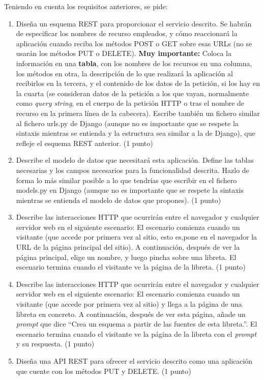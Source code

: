 \newpage

Teniendo en cuenta los requisitos anteriores, se pide:

\begin{enumerate}
  \item Diseña un esquema REST para proporcionar el servicio descrito. Se habrán de especificar los nombres de recurso empleados, y cómo reaccionará la aplicación cuando reciba los métodos POST o GET sobre esas URLs (no se usarán los métodos PUT o DELETE). \textbf{Muy importante:} Coloca la información en una \textbf{tabla}, con los nombres de los recursos en una columna, los métodos en otra, la descripción de lo que realizará la aplicación al recibirlos en la tercera, y el contenido de los datos de la petición, si los hay en la cuarta (se consideran datos de la petición a los que vayan, normalmente como \emph{query string}, en el cuerpo de la petición HTTP o tras el nombre de recurso en la primera línea de la cabecera). Escribe también un fichero similar al fichero urls.py de Django (aunque no es importante que se respete la sintaxis mientras se entienda y la estructura sea similar a la de Django), que refleje el esquema REST anterior. (1 punto)

  \item Describe el modelo de datos que necesitará esta aplicación. Define las tablas necesarias y los campos necesarios para la funcionalidad descrita. Hazlo de forma lo más similar posible a lo que tendrías que escribir en el fichero models.py en Django (aunque no es importante que se respete la sintaxis mientras se entienda el modelo de datos que propones). (1 punto)

  \item Describe las interacciones HTTP que ocurrirán entre el navegador y cualquier servidor web en el siguiente escenario: El escenario comienza cuando un visitante (que accede por primera vez al sitio, esto es,pone en el navegador la URL de la página principal del sitio). A continuación, después de ver la página principal, elige un nombre, y luego pincha sobre una libreta. El escenario termina cuando el visitante ve la página de la libreta. (1 punto)

  \item Describe las interacciones HTTP que ocurrirán entre el navegador y cualquier servidor web en el siguiente escenario: El escenario comienza cuando un visitante (que accede por primera vez al sitio) y llega a la página de una libreta en concreto. A continuación, después de ver esta página, añade un \emph{prompt} que dice ``Crea un esquema a partir de las fuentes de esta libreta.''. El escenario termina cuando el visitante ve la página de la libreta con el \emph{prompt} y su respuesta. (1 punto)

  \item Diseña una API REST para ofrecer el servicio descrito como una aplicación que cuente con los métodos PUT y DELETE. (1 punto)

\end{enumerate}

